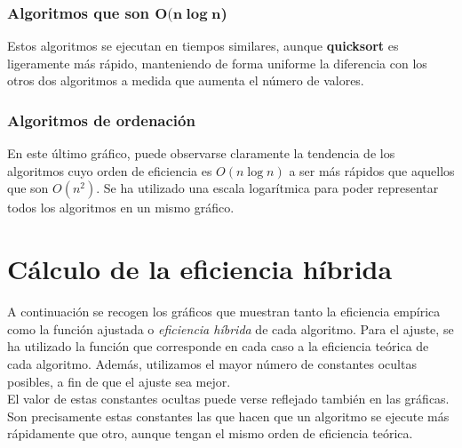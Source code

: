 \documentclass[11pt]{article}
\begin{document}
\subsubsection*{Algoritmos que son $\boldsymbol{O(n\log n}$)}

\begin{adjustbox}{center}
	
\end{adjustbox}
\vspace{1em}

Estos algoritmos se ejecutan en tiempos similares, aunque \textbf{quicksort} es ligeramente más rápido, manteniendo de forma uniforme la diferencia con los otros dos algoritmos a medida que aumenta el número de valores.

\subsubsection*{Algoritmos de ordenación}

\begin{adjustbox}{center}
	
\end{adjustbox}
\vspace{1em}

En este último gráfico, puede observarse claramente la tendencia de los algoritmos cuyo orden de eficiencia es $O(n\log n)$ a ser más rápidos que aquellos que son $O(n^2)$. Se ha utilizado una escala logarítmica para poder representar todos los algoritmos en un mismo gráfico.

\newpage


\section*{Cálculo de la eficiencia híbrida}
A continuación se recogen los gráficos que muestran tanto la eficiencia empírica como la función ajustada o \textit{eficiencia híbrida} de cada algoritmo. Para el ajuste, se ha utilizado la función que corresponde en cada caso a la eficiencia teórica de cada algoritmo. Además, utilizamos el mayor número de constantes ocultas posibles, a fin de que el ajuste sea mejor.\\

El valor de estas constantes ocultas puede verse reflejado también en las gráficas. Son precisamente estas constantes las que hacen que un algoritmo se ejecute más rápidamente que otro, aunque tengan el mismo orden de eficiencia teórica. 
\end{document}
